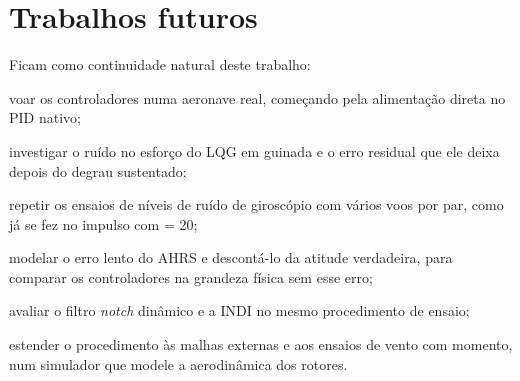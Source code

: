 \section{Trabalhos futuros}
\label{sec:trabalhos-futuros}

Ficam como continuidade natural deste trabalho:
\begin{alineas}
    \item voar os controladores numa aeronave real, começando pela
          alimentação direta no PID nativo;
    \item investigar o ruído no esforço do LQG em guinada e o erro residual
          que ele deixa depois do degrau sustentado;
    \item repetir os ensaios de níveis de ruído de giroscópio com vários voos
          por par, como já se fez no impulso com
           = 20;
    \item modelar o erro lento do AHRS e descontá-lo da atitude verdadeira,
          para comparar os controladores na grandeza física sem esse erro;
    \item avaliar o filtro \textit{notch} dinâmico e a INDI no mesmo
          procedimento de ensaio;
    \item estender o procedimento às malhas externas e aos ensaios de vento
          com momento, num simulador que modele a aerodinâmica dos rotores.
\end{alineas}
